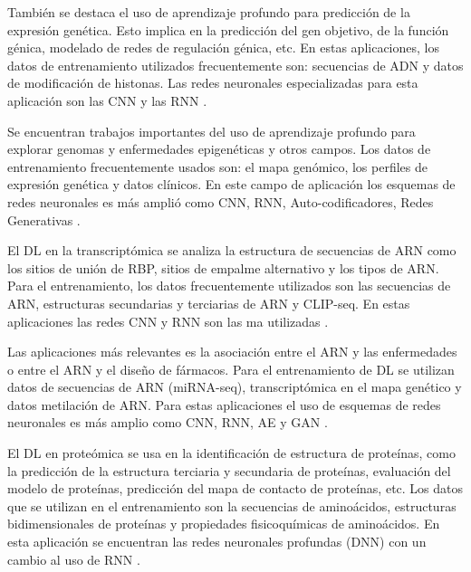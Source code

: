 También se destaca el uso de aprendizaje profundo para predicción de la expresión genética. Esto implica en la predicción del gen objetivo, de la función génica, modelado de redes de regulación génica, etc. En estas aplicaciones, los datos de entrenamiento utilizados frecuentemente son: secuencias de ADN y datos de modificación de histonas. Las redes neuronales especializadas para esta aplicación son las CNN y las RNN \citep{quang2016danq,raza2016recurrent,zhou2015predicting,cuperus2017deep,koh2017denoising}.

Se encuentran trabajos importantes del uso de aprendizaje profundo para explorar genomas y enfermedades epigenéticas y otros campos. Los datos de entrenamiento frecuentemente usados son: el mapa genómico, los perfiles de expresión genética y datos clínicos. En este campo de aplicación los esquemas de redes neuronales es más amplió como CNN, RNN, Auto-codificadores, Redes Generativas \citep{liang2014integrative,yousefi2017predicting,young2017unsupervised}.

El DL en la transcriptómica se analiza la estructura de secuencias de ARN como los sitios de unión de RBP, sitios de empalme alternativo y los tipos de ARN. Para el entrenamiento, los datos frecuentemente utilizados son las secuencias de ARN, estructuras secundarias y terciarias de ARN y CLIP-seq. En estas aplicaciones las redes CNN y RNN son las ma utilizadas \citep{xu2017deep,zhang2017sequence,pan2017rna}.

Las aplicaciones más relevantes es la asociación entre el ARN y las enfermedades o entre el ARN y el diseño de fármacos. Para el entrenamiento de DL se utilizan datos de secuencias de ARN (miRNA-seq), transcriptómica en el mapa genético y datos metilación de ARN. Para estas aplicaciones el uso de esquemas de redes neuronales es más amplio como CNN, RNN, AE y GAN \citep{chaudhary2018deep,yu2018drug,aliper2016deep,bhat2016deepcancer}.

El DL en proteómica se usa en la identificación de estructura de proteínas, como la predicción de la estructura terciaria y secundaria de proteínas, evaluación del modelo de proteínas, predicción del mapa de contacto de proteínas, etc. Los datos que se utilizan en el entrenamiento son la secuencias de aminoácidos, estructuras bidimensionales de proteínas y propiedades fisicoquímicas de aminoácidos. En esta aplicación se encuentran las redes neuronales profundas (DNN) con un cambio al uso de RNN \citep{stahl2017epsilon,li2017deep,spencer2014deep,heffernan2015improving}.


